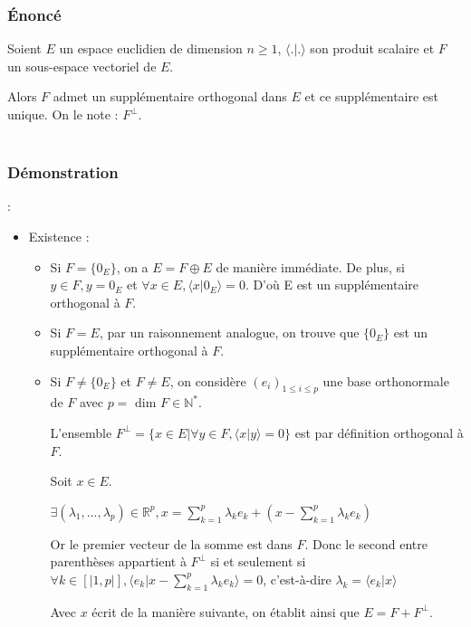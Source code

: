 \documentclass{article}
\begin{document}
\subsubsection{\uppercase{é}noncé}
Soient $E$ un espace euclidien de dimension $n \geq 1$, $\langle .| .\rangle$ son produit scalaire et $F$ un sous-espace vectoriel de $E$.

Alors $F$ admet un supplémentaire orthogonal dans $E$ et ce supplémentaire est unique. On le note : $F^{\perp}$.
 \\
 \\
\subsubsection{Démonstration} :

\begin{itemize}

\item Existence :

\begin{itemize}


\item Si $F = \{0_E\}$, on a $E = F \oplus E$ de manière immédiate. De plus, si $y \in F, y = 0_E$ et $\forall x \in E, \langle x|0_E \rangle = 0 $. D'où E est un supplémentaire orthogonal à $F$. 

\item Si $F = E$, par un raisonnement analogue, on trouve que $\{0_E\}$ est un supplémentaire orthogonal à $F$.

\item Si $F \neq \{0_E\}$ et $F \neq E$, on considère $(e_i)_{1\leq{}i\leq{}p}$ une base orthonormale de $F$ avec $p =$ dim $F \in \mathbb{N}^{*}.$

L'ensemble $F^{\perp} = \{ x \in E | \forall y \in F, \langle x|y \rangle = 0 \}$ est par définition orthogonal à $F$.

Soit $x \in E$.

$\exists (\lambda{}_{1}, ..., \lambda{}_{p}) \in \mathbb{R}^p , x = \sum_{k = 1}^{p} \lambda{}_{k}e_k + (x - \sum_{k = 1}^{p} \lambda{}_{k}e_k)$

Or le premier vecteur de la somme est dans $F$. Donc le second entre parenthèses appartient à $F^{\perp}$ si et seulement si $\forall k \in [|1,p|], \langle e_k | x - \sum_{k = 1}^{p}\lambda{}_{k}e_k \rangle = 0$, c'est-à-dire $\lambda_{k} = \langle e_k | x \rangle$

Avec $x$ écrit de la manière suivante, on établit ainsi que  $E = F + F^{\perp}$.


\end{itemize}
\end{itemize}
\end{document}
